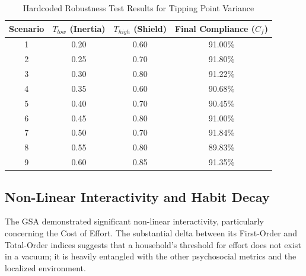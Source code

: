\begin{table}[htbp]
\centering
\caption{Hardcoded Robustness Test Results for Tipping Point Variance}
\label{tab:robustness_results}
\begin{tabular}{@{}cccc@{}}
\toprule
\textbf{Scenario} & \textbf{\(T_{low}\) (Inertia)} & \textbf{\(T_{high}\) (Shield)} & \textbf{Final Compliance (\(C_f\))} \\ \midrule
1                 & 0.20                           & 0.60                            & 91.00\%                            \\
2                 & 0.25                           & 0.70                            & 91.80\%                            \\
3                 & 0.30                           & 0.80                            & 91.22\%                            \\
4                 & 0.35                           & 0.60                            & 90.68\%                            \\
5                 & 0.40                           & 0.70                            & 90.45\%                            \\
6                 & 0.45                           & 0.80                            & 91.00\%                            \\
7                 & 0.50                           & 0.70                            & 91.84\%                            \\
8                 & 0.55                           & 0.80                            & 89.83\%                            \\
9                 & 0.60                           & 0.85                            & 91.35\%                            \\ \bottomrule
\end{tabular}
\end{table}

\subsection{Non-Linear Interactivity and Habit Decay}

The GSA demonstrated significant non-linear interactivity, particularly concerning the Cost of Effort. The substantial delta between its First-Order and Total-Order indices suggests that a household's threshold for effort does not exist in a vacuum; it is heavily entangled with the other psychosocial metrics and the localized environment. 

